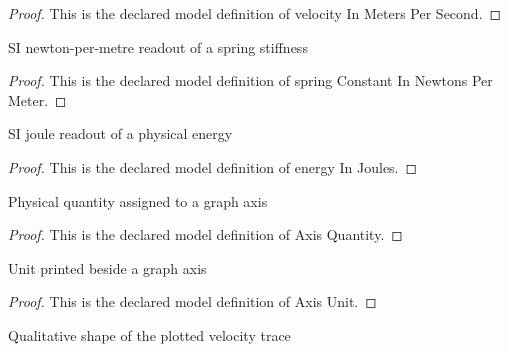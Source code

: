 \begin{proof}
  This is the declared model definition of velocity In Meters Per Second.
\end{proof}
\begin{definition}
  \label{def:physics:phyx-mini-0280:phyxminiproblems-problemphyxmini0280-springconstantinnewtonspermeter}
  SI newton-per-metre readout of a spring stiffness
\end{definition}
\begin{proof}
  This is the declared model definition of spring Constant In Newtons Per Meter.
\end{proof}
\begin{definition}
  \label{def:physics:phyx-mini-0280:phyxminiproblems-problemphyxmini0280-energyinjoules}
  SI joule readout of a physical energy
\end{definition}
\begin{proof}
  This is the declared model definition of energy In Joules.
\end{proof}
\begin{definition}
  \label{def:physics:phyx-mini-0280:phyxminiproblems-problemphyxmini0280-axisquantity}
  Physical quantity assigned to a graph axis
\end{definition}
\begin{proof}
  This is the declared model definition of Axis Quantity.
\end{proof}
\begin{definition}
  \label{def:physics:phyx-mini-0280:phyxminiproblems-problemphyxmini0280-axisunit}
  Unit printed beside a graph axis
\end{definition}
\begin{proof}
  This is the declared model definition of Axis Unit.
\end{proof}
\begin{definition}
  \label{def:physics:phyx-mini-0280:phyxminiproblems-problemphyxmini0280-waveformshape}
  Qualitative shape of the plotted velocity trace
\end{definition}
